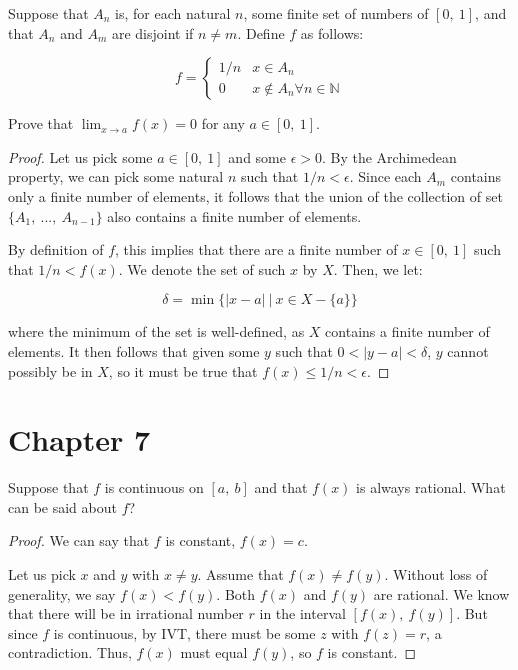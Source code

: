 \documentclass[10pt, oneside]{article}
\newenvironment{problem}[2][Problem]{\begin{trivlist}
\item[\hskip \labelsep {\bfseries #1}\hskip \labelsep {\bfseries #2.}]}{\end{trivlist}}
\begin{document}
    \begin{problem}{5.24}

      Suppose that $A_n$ is, for each natural $n$, some finite set of numbers of $[0, \ 1]$, and
      that $A_n$ and $A_m$ are disjoint if $n \neq m$. Define $f$ as follows:

      $$f = \begin{cases}
        1/n & x \in A_n \\
        0 & x \notin A_n \forall n \in \mathbb{N}
      \end{cases}
      $$

      Prove that $\lim_{x \to a} f(x) = 0$ for any $a \in [0, \ 1]$.

    \end{problem}

    \begin{proof}

      Let us pick some $a \in [0, \ 1]$ and some $\epsilon > 0$. By the Archimedean property, we can pick some natural $n$ such that
      $1/n < \epsilon$. Since each $A_m$ contains only a finite number of elements, it follows that the union of the collection
      of set $\{A_{1}, \ ..., \ A_{n - 1}\}$ also contains a finite number of elements.
      \newline

      By definition of $f$, this implies that there are a finite
      number of $x \in [0, \ 1]$ such that $1/n < f(x)$. We denote the set of such $x$ by $X$. Then, we let:

      $$\delta = \min\{|x - a| \ | \ x \in X - \{a\}\}$$

      where the minimum of the set is well-defined, as $X$ contains a finite number of elements. It then follows that
      given some $y$ such that $0 < |y - a| < \delta$, $y$ cannot possibly be in $X$, so it must be true that $f(x) \leq 1/n < \epsilon$.

    \end{proof}


    \section{Chapter 7}

    \begin{problem}{7.5}
      Suppose that $f$ is continuous on $[a, \ b]$ and that $f(x)$ is always rational. What can be said about $f$?
    \end{problem}

    \begin{proof}
      We can say that $f$ is constant, $f(x) = c$.
      \newline

      Let us pick $x$ and $y$ with $x \neq y$. Assume that $f(x) \neq f(y)$. Without loss of generality, we say $f(x) < f(y)$. Both
      $f(x)$ and $f(y)$ are rational. We know that there will be in irrational number $r$ in the interval $[f(x), \ f(y)]$. But since $f$ is continuous, by
      IVT, there must be some $z$ with $f(z) = r$, a contradiction. Thus, $f(x)$ must equal $f(y)$, so $f$ is constant.
      \end{proof}
\end{document}
